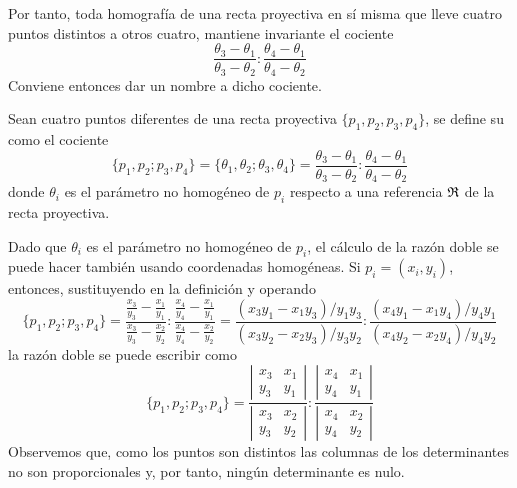Por tanto, toda homografía de una recta proyectiva en sí misma que lleve cuatro puntos distintos a otros cuatro, mantiene invariante el cociente 
\begin{equation*}
	\frac{\theta_3-\theta_1}{\theta_3-\theta_2}:\frac{\theta_4-\theta_1}{\theta_4-\theta_2}
\end{equation*}
Conviene entonces dar un nombre a dicho cociente.
\begin{defi}
	Sean cuatro puntos diferentes de una recta proyectiva $\{p_1,p_2,p_3,p_4\}$, se define su  como el cociente
	\begin{equation}
	\{p_1,p_2;p_3,p_4\}=\{\theta_1,\theta_2;\theta_3,\theta_4\}=\frac{\theta_3-\theta_1}{\theta_3-\theta_2}:\frac{\theta_4-\theta_1}{\theta_4-\theta_2}
	\end{equation}
	donde $\theta_i$ es el parámetro no homogéneo de $p_i$ respecto a una referencia $\mathfrak{R}$ de la recta proyectiva.
\end{defi}
\begin{obs}
	Dado que $\theta_i$ es el parámetro no homogéneo de $p_i$, el cálculo de la razón doble se puede hacer también usando coordenadas homogéneas. Si $p_i=(x_i,y_i)$, entonces, sustituyendo en la definición y operando
	\begin{equation*}
		\{p_1,p_2;p_3,p_4\}=\frac{\frac{x_3}{y_3}-\frac{x_1}{y_1}}{\frac{x_3}{y_3}-\frac{x_2}{y_2}}:\frac{\frac{x_4}{y_4}-\frac{x_1}{y_1}}{\frac{x_4}{y_4}-\frac{x_2}{y_2}}=\frac{(x_3y_1-x_1y_3)/y_1y_3}{(x_3y_2-x_2y_3)/y_3y_2}:\frac{(x_4y_1-x_1y_4)/y_4y_1}{(x_4y_2-x_2y_4)/y_4y_2}
	\end{equation*}
	la razón doble se puede escribir como
	\begin{equation}
	\{p_1,p_2;p_3,p_4\}=\frac{
		\left| \begin{array}{cc}
				x_3&x_1\\
				y_3&y_1
		\end{array}\right|}{
		\left| \begin{array}{cc}
		x_3&x_2\\
		y_3&y_2
		\end{array}\right|}:\frac{
		\left| \begin{array}{cc}
		x_4&x_1\\
		y_4&y_1
		\end{array}\right|}{
		\left| \begin{array}{cc}
		x_4&x_2\\
		y_4&y_2
		\end{array}\right|}
	\end{equation}
	Observemos que, como los puntos son distintos las columnas de los determinantes no son proporcionales y, por tanto, ningún determinante es nulo.
\end{obs}
